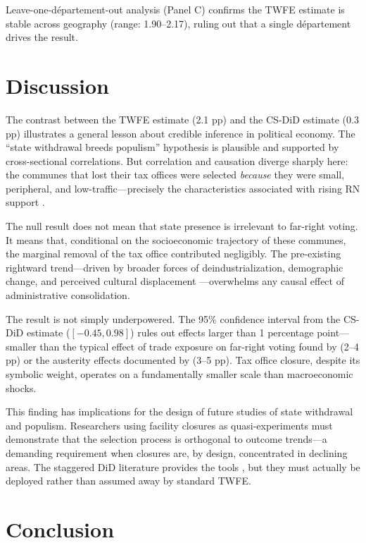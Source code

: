\documentclass[12pt]{article}
\begin{document}
Leave-one-d\'{e}partement-out analysis (Panel C) confirms the TWFE estimate is stable across geography (range: 1.90--2.17), ruling out that a single d\'{e}partement drives the result.

\section{Discussion}

The contrast between the TWFE estimate (2.1 pp) and the CS-DiD estimate (0.3 pp) illustrates a general lesson about credible inference in political economy. The ``state withdrawal breeds populism'' hypothesis is plausible and supported by cross-sectional correlations. But correlation and causation diverge sharply here: the communes that lost their tax offices were selected \textit{because} they were small, peripheral, and low-traffic---precisely the characteristics associated with rising RN support \citep{guilluy2014france}.

The null result does not mean that state presence is irrelevant to far-right voting. It means that, conditional on the socioeconomic trajectory of these communes, the marginal removal of the tax office contributed negligibly. The pre-existing rightward trend---driven by broader forces of deindustrialization, demographic change, and perceived cultural displacement \citep{guilluy2014france,inglehart2016trump}---overwhelms any causal effect of administrative consolidation.

The result is not simply underpowered. The 95\% confidence interval from the CS-DiD estimate ($[-0.45, 0.98]$) rules out effects larger than 1 percentage point---smaller than the typical effect of trade exposure on far-right voting found by \citet{colantone2018global} (2--4 pp) or the austerity effects documented by \citet{fetzer2019did} (3--5 pp). Tax office closure, despite its symbolic weight, operates on a fundamentally smaller scale than macroeconomic shocks.

This finding has implications for the design of future studies of state withdrawal and populism. Researchers using facility closures as quasi-experiments must demonstrate that the selection process is orthogonal to outcome trends---a demanding requirement when closures are, by design, concentrated in declining areas. The staggered DiD literature provides the tools \citep{callaway2021difference,sun2021estimating}, but they must actually be deployed rather than assumed away by standard TWFE.

\section{Conclusion}
\end{document}
